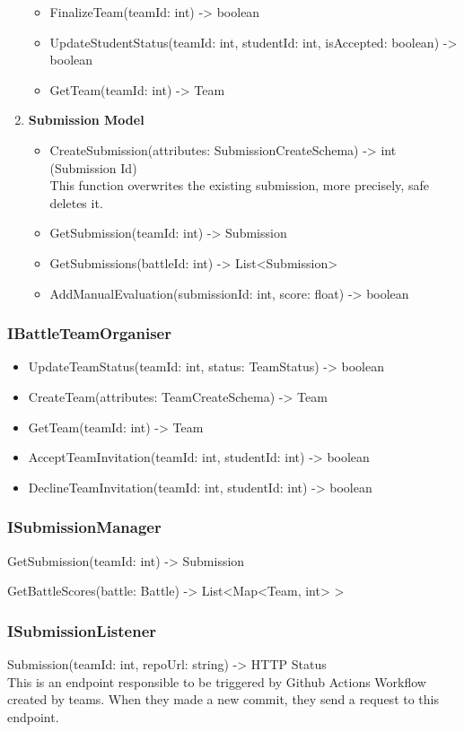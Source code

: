 \begin{enumerate}
\begin{itemize}
        \item FinalizeTeam(teamId: int) -> boolean
        \item UpdateStudentStatus(teamId: int, studentId: int, isAccepted: boolean) -> boolean
        \item GetTeam(teamId: int) -> Team
    \end{itemize}
    \item \textbf{Submission Model}
    \begin{itemize}
        \item CreateSubmission(attributes: SubmissionCreateSchema) -> int (Submission Id) \\
        This function overwrites the existing submission, more precisely, safe deletes it.
        \item GetSubmission(teamId: int) -> Submission
        \item GetSubmissions(battleId: int) -> List<Submission>
        \item AddManualEvaluation(submissionId: int, score: float) -> boolean
    \end{itemize}
\end{enumerate}
\subsubsection{IBattleTeamOrganiser}
\begin{itemize}
    \item UpdateTeamStatus(teamId: int, status: TeamStatus) -> boolean
    \item CreateTeam(attributes: TeamCreateSchema) -> Team
    \item GetTeam(teamId: int) -> Team
    \item AcceptTeamInvitation(teamId: int, studentId: int) -> boolean
    \item DeclineTeamInvitation(teamId: int, studentId: int) -> boolean
\end{itemize}
\subsubsection{ISubmissionManager}
    \item GetSubmission(teamId: int) -> Submission
    \item GetBattleScores(battle: Battle) -> List<Map<Team, int> >
\subsubsection{ISubmissionListener}
    \item Submission(teamId: int, repoUrl: string) -> HTTP Status \\
    This is an endpoint responsible to be triggered by Github Actions Workflow created by teams. When they made a new commit, they  send a request to this endpoint.
